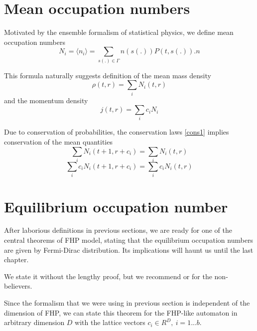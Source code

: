 \section{Mean occupation numbers}
Motivated by the ensemble formalism of statistical physics, we define mean occupation numbers
\begin{equation}
N_i = \langle n_i \rangle = \sum_{s(.) \in \Gamma} n(s(.)) P(t,s(.)) .n
\end{equation}

This formula naturally suggests definition of the mean mass density
\begin{equation}
\rho(t,r) = \sum_i N_i(t,r)
\end{equation}
and the momentum density
\begin{equation}
j(t,r) = \sum_i c_i N_i
\end{equation}

Due to conservation of probabilities, the conservation laws \ref{cons1} implies conservation of the mean quantities
\begin{equation} \label{macro1}
\sum_i N_i(t+1,r+c_i) = \sum_i N_i(t,r) 
\end{equation}
\begin{equation} \label{macro2}
\sum_i c_i N_i(t+1,r+c_i) = \sum_i c_i N_i(t,r)
\end{equation}

\section{Equilibrium occupation number}
After laborious definitions in previous sections, we are ready for one of the central theorems of FHP model, stating that the equilibrium occupation numbers are given by Fermi-Dirac distribution. Its implications will haunt us until the last chapter.

We state it without the lengthy proof, but we recommend \cite{wolf} or \cite{frisch} for the non-believers.

\bigskip
Since the formalism that we were using in previous section is independent of the dimension of FHP, we can state this theorem for the FHP-like automaton in arbitrary dimension $D$ with the lattice vectors $c_i \in R^D,~i=1...b$.

\bigskip

